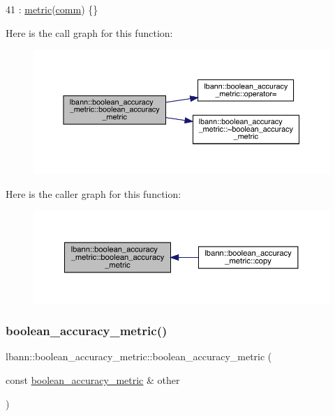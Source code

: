 \begin{DoxyCode}
41 : \hyperlink{classlbann_1_1metric_a3cd2d4f7dcbf94f70b3b8560a3171d9d}{metric}(\hyperlink{file__io_8cpp_ab048c6f9fcbcfaa57ce68b00263dbebe}{comm}) \{\}
\end{DoxyCode}
Here is the call graph for this function\+:\nopagebreak
\begin{figure}[H]
\begin{center}
\leavevmode
\includegraphics[width=350pt]{classlbann_1_1boolean__accuracy__metric_a91e8f2a608e0594e8875c58d584bda9c_cgraph}
\end{center}
\end{figure}
Here is the caller graph for this function\+:\nopagebreak
\begin{figure}[H]
\begin{center}
\leavevmode
\includegraphics[width=350pt]{classlbann_1_1boolean__accuracy__metric_a91e8f2a608e0594e8875c58d584bda9c_icgraph}
\end{center}
\end{figure}
\mbox{\label{classlbann_1_1boolean__accuracy__metric_af79f675c84b0e90ecd449f8be3fbc213}} 
\subsubsection{\texorpdfstring{boolean\+\_\+accuracy\+\_\+metric()}{boolean\_accuracy\_metric()}\hspace{0.1cm}{\footnotesize\ttfamily [2/2]}}
{\footnotesize\ttfamily lbann\+::boolean\+\_\+accuracy\+\_\+metric\+::boolean\+\_\+accuracy\+\_\+metric (\begin{DoxyParamCaption}\item[{const \hyperlink{classlbann_1_1boolean__accuracy__metric}{boolean\+\_\+accuracy\+\_\+metric} \&}]{other }\end{DoxyParamCaption})\hspace{0.3cm}{\ttfamily [default]}}

